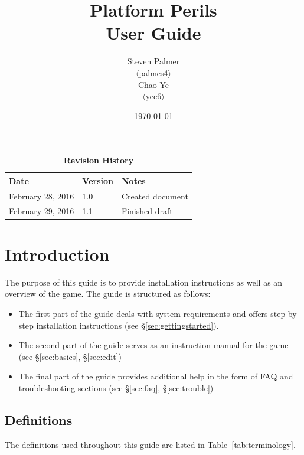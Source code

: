 \documentclass[12pt, titlepage]{article}
\begin{document}
\title{\bf Platform Perils\\[\baselineskip]\Large User Guide}
\author{Steven Palmer\\$\langle$palmes4$\rangle$\\Chao Ye\\$\langle$yec6$\rangle$}
\date{\today}
	
\maketitle

\tableofcontents
\listoftables
\listoffigures


\begin{table}[b]
\caption*{\bf Revision History}
\begin{tabularx}{\textwidth}{p{3.5cm}p{2cm}X}
\toprule {\bf Date} & {\bf Version} & {\bf Notes}\\
\midrule
February 28, 2016 & 1.0 & Created document\\
February 29, 2016 & 1.1 & Finished draft\\
\bottomrule
\end{tabularx}
\end{table}

\newpage


\section{Introduction}
The purpose of this guide is to provide installation instructions as well as an overview of the game.  The guide is structured as follows:

\begin{itemize}
  \item The first part of the guide deals with system requirements and offers step-by-step installation instructions (see \hyperref[sec:gettingstarted]{\S\ref*{sec:gettingstarted}}).
  \item The second part of the guide serves as an instruction manual for the game (see \hyperref[sec:basics]{\S\ref*{sec:basics}}, \hyperref[sec:edit]{\S\ref*{sec:edit}})
  \item The final part of the guide provides additional help in the form of FAQ and troubleshooting sections (see \hyperref[sec:faq]{\S\ref*{sec:faq}}, \hyperref[sec:trouble]{\S\ref*{sec:trouble}})
\end{itemize}

\subsection{Definitions}
The definitions used throughout this guide are listed in \hyperref[tab:terminology]{Table~\ref*{tab:terminology}}.
\end{document}
